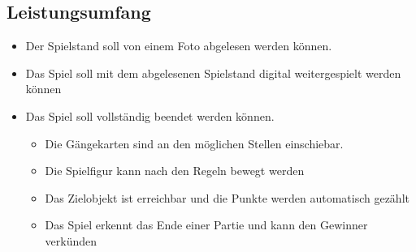 \documentclass{article}
\begin{document}
\subsection{Leistungsumfang}
\begin{itemize}
\item Der Spielstand soll von einem Foto abgelesen werden können.
\item Das Spiel soll mit dem abgelesenen Spielstand digital weitergespielt werden können
\item Das Spiel soll vollständig beendet werden können.
	\begin{itemize}
	\item Die Gängekarten sind an den möglichen Stellen einschiebar.
	\item Die Spielfigur kann nach den Regeln bewegt werden
	\item Das Zielobjekt ist erreichbar und die Punkte werden automatisch gezählt
	\item Das Spiel erkennt das Ende einer Partie und kann den Gewinner verkünden
	\end{itemize}
\end{itemize}
\end{document}
